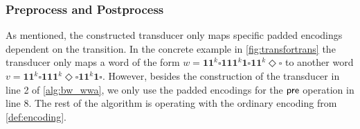 %
%
%
%
%


\subsubsection{Preprocess and Postprocess}

As mentioned, the constructed transducer only maps specific padded encodings dependent on the transition. In the concrete example in \autoref{fig:transfortrans} the transducer only maps a word of the form $w = \bm{11}^{k}\square\bm{111}^{k}\bm{1}\square\bm{11}^{k}\Diamond\square$ to another word $v = \bm{11}^{k}\square\bm{111}^{k}\Diamond\square\bm{11}^{k}\bm{1}\square$. However, besides the construction of the transducer in line 2 of \autoref{alg:bw_wwa}, we only use the padded encodings for the $\operatorname{\textsf{pre}}$ operation in line 8. The rest of the algorithm is operating with the ordinary encoding from \autoref{def:encoding}.

